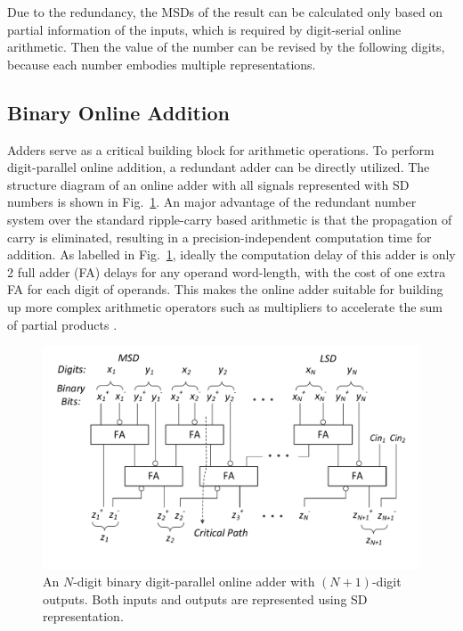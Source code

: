 \documentclass[conference]{IEEEtran}
\begin{document}
Due to the redundancy, the MSDs of the result can be calculated only based on partial information of the inputs, which is required by digit-serial online arithmetic. Then the value of the number can be revised by the following digits, because each number embodies multiple representations.

\subsection{Binary Online Addition}
Adders serve as a critical building block for arithmetic operations. To perform digit-parallel online addition, a redundant adder can be directly utilized. The structure diagram of an online adder with all signals represented with SD numbers is shown in Fig.~\ref{Fig:Radix2SD_adder}. An major advantage of the redundant number system over the standard ripple-carry based arithmetic is that the propagation of carry is eliminated, resulting in a precision-independent computation time for addition. As labelled in Fig.~\ref{Fig:Radix2SD_adder}, ideally the computation delay of this adder is only 2 full adder (FA) delays for any operand word-length, with the cost of one extra FA for each digit of operands. This makes the online adder suitable for building up more complex arithmetic operators such as multipliers to accelerate the sum of partial products \cite{RedundantMult_1987}.

\begin{figure}[htbp]
	\centering
	\includegraphics[width=.5\textwidth]{./Figures/SDAdder.pdf}
    \vspace{-5ex}
	\caption{An $N$-digit binary digit-parallel online adder with $(N+1)$-digit outputs. Both inputs and outputs are represented using SD representation.}
    \vspace{2ex}
	\label{Fig:Radix2SD_adder}
\end{figure}

\end{document}
